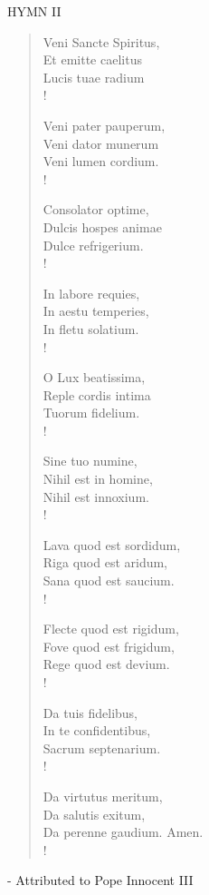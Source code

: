 \noindent\small{\uppercase{Hymn II}}\normalsize\label{pentecost:lastHymn}
\begin{verse}
Veni Sancte Spiritus,\\
Et emitte caelitus\\
Lucis tuae radium\\!

Veni pater pauperum,\\
Veni dator munerum\\
Veni lumen cordium.\\!

Consolator optime,\\
Dulcis hospes animae\\
Dulce refrigerium.\\!

In labore requies,\\
In aestu temperies,\\
In fletu solatium.\\!

O Lux beatissima,\\
Reple cordis intima\\
Tuorum fidelium.\\!

Sine tuo numine,\\
Nihil est in homine,\\
Nihil est innoxium.\\!

Lava quod est sordidum,\\
Riga quod est aridum,\\
Sana quod est saucium.\\!

Flecte quod est rigidum,\\
Fove quod est frigidum,\\
Rege quod est devium.\\!

Da tuis fidelibus,\\
In te confidentibus,\\
Sacrum septenarium.\\!

Da virtutus meritum,\\
Da salutis exitum,\\
Da perenne gaudium. Amen.\\!
\end{verse}
\begin{flushright}\tiny - Attributed to Pope Innocent III\end{flushright}

